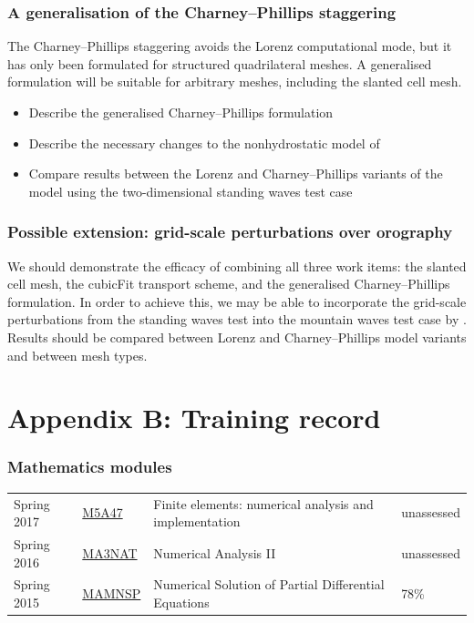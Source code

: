 \documentclass[a4paper,11pt]{article}
\begin{document}
\subsubsection*{A generalisation of the Charney--Phillips staggering}
\noindent The Charney--Phillips staggering avoids the Lorenz computational mode, but it has only been formulated for structured quadrilateral meshes.  A generalised formulation will be suitable for arbitrary meshes, including the slanted cell mesh.
\begin{itemize}[itemsep=0.1em]
	\item Describe the generalised Charney--Phillips formulation
	\item Describe the necessary changes to the nonhydrostatic model of \citet{weller-shahrokhi2014}
	\item Compare results between the Lorenz and Charney--Phillips variants of the model using the two-dimensional standing waves test case
\end{itemize}

\subsubsection*{Possible extension: grid-scale perturbations over orography}
\noindent We should demonstrate the efficacy of combining all three work items: the slanted cell mesh, the cubicFit transport scheme, and the generalised Charney--Phillips formulation.  In order to achieve this, we may be able to incorporate the grid-scale perturbations from the standing waves test into the mountain waves test case by \citet{schaer2002}.
Results should be compared between Lorenz and Charney--Phillips model variants and between mesh types.

\newpage

\section*{Appendix B: Training record}

\subsubsection*{Mathematics modules}
\footnotesize
\begin{tabular}{l l l l}
Spring 2017	& \href{https://finite-element.github.io}{M5A47}  & Finite elements: numerical analysis and implementation & unassessed \\
Spring 2016	& \href{www.reading.ac.uk/module/document.aspx?modP=MA3NAT&modYR=1516}{MA3NAT} & Numerical Analysis II & unassessed \\
Spring 2015	& \href{www.reading.ac.uk/modules/document.aspx?modP=MAMNSP&modYR=1415}{MAMNSP} & Numerical Solution of Partial Differential Equations  & 78\% \\
\end{tabular}
\end{document}
